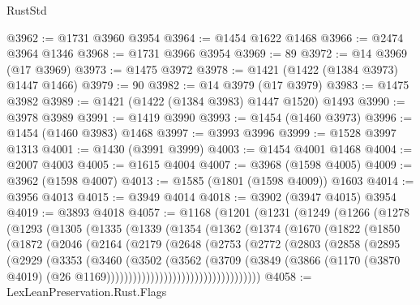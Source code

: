 \begin{lexlean}{RustStd}
\begin{coremodule}
@3962 := @1731 @3960 @3954
@3964 := @1454 @1622 @1468
@3966 := @2474 @3964 @1346
@3968 := @1731 @3966 @3954
@3969 := 89
@3972 := @14 @3969 (@17 @3969)
@3973 := @1475 @3972
@3978 := @1421 (@1422 (@1384 @3973) @1447 @1466)
@3979 := 90
@3982 := @14 @3979 (@17 @3979)
@3983 := @1475 @3982
@3989 := @1421 (@1422 (@1384 @3983) @1447 @1520) @1493
@3990 := @3978 @3989
@3991 := @1419 @3990
@3993 := @1454 (@1460 @3973)
@3996 := @1454 (@1460 @3983) @1468
@3997 := @3993 @3996
@3999 := @1528 @3997 @1313
@4001 := @1430 (@3991 @3999)
@4003 := @1454 @4001 @1468
@4004 := @2007 @4003
@4005 := @1615 @4004
@4007 := @3968 (@1598 @4005)
@4009 := @3962 (@1598 @4007)
@4013 := @1585 (@1801 (@1598 @4009)) @1603
@4014 := @3956 @4013
@4015 := @3949 @4014
@4018 := @3902 (@3947 @4015) @3954
@4019 := @3893 @4018
@4057 := @1168
    (@1201
      (@1231
        (@1249
          (@1266
            (@1278
              (@1293
                (@1305
                  (@1335
                    (@1339
                      (@1354
                        (@1362
                          (@1374
                            (@1670
                              (@1822
                                (@1850
                                  (@1872
                                    (@2046
                                      (@2164
                                        (@2179
                                          (@2648
                                            (@2753
                                              (@2772
                                                (@2803
                                                  (@2858
                                                    (@2895
                                                      (@2929
                                                        (@3353
                                                          (@3460
                                                            (@3502
                                                              (@3562
                                                                (@3709
                                                                  (@3849
                                                                    (@3866
                                                                      (@1170
                                                                        (@3870 @4019)
                                                                        (@26
                                                                          @1169)))))))))))))))))))))))))))))))))))
@4058 := LexLeanPreservation.Rust.Flags

\end{coremodule}
\end{lexlean}

